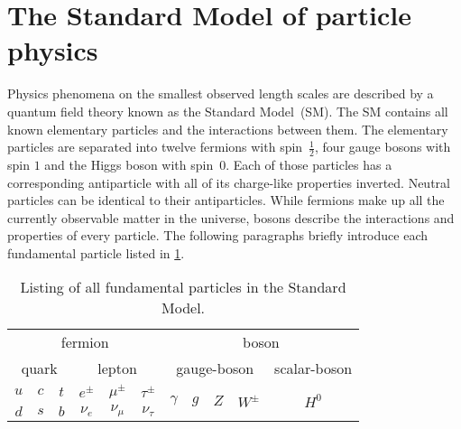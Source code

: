 \section{The Standard Model of particle physics}

Physics phenomena on the smallest observed length scales are described by a quantum field theory known as the Standard Model~(SM).
The SM contains all known elementary particles and the interactions between them.
The elementary particles are separated into twelve fermions with spin~$\frac{1}{2}$, four gauge bosons with spin $1$ and the Higgs boson with spin~$0$.
Each of those particles has a corresponding antiparticle with all of its charge-like properties inverted.
Neutral particles can be identical to their antiparticles.
While fermions make up all the currently observable matter in the universe, bosons describe the interactions and properties of every particle.
The following paragraphs briefly introduce each fundamental particle listed in \cref{tab:sm_particles}.

\begin{table}
    \centering
    \caption{Listing of all fundamental particles in the Standard Model.}
    \begin{tabular}{c c c | c c c | c c c c | c}
        \toprule
        \multicolumn{6}{c|}{fermion} & \multicolumn{5}{c}{boson} \\
        \multicolumn{3}{c}{quark} & \multicolumn{3}{c|}{lepton} & \multicolumn{4}{c}{gauge-boson} & \multicolumn{1}{c}{scalar-boson} \\
        \midrule
        $u$ & $c$ & $t$ & $e^\pm$ & $\mu^\pm$ & $\tau^\pm$ & \multirow{2}{*}{$\gamma$} & \multirow{2}{*}{$g$} & \multirow{2}{*}{$Z$} & \multirow{2}{*}{$W^\pm$} & \multirow{2}{*}{$H^0$} \\
        $d$ & $s$ & $b$ & $\nu_e$ & $\nu_\mu$ & $\nu_\tau$ &&&&& \\
        \bottomrule
    \end{tabular}
    \label{tab:sm_particles}
\end{table}

